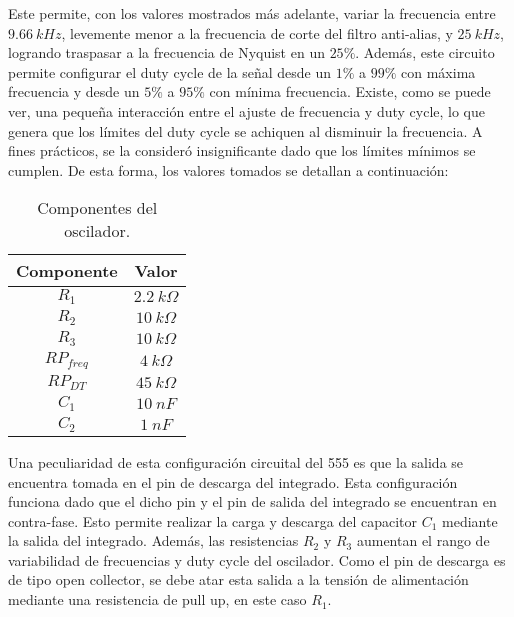 Este permite, con los valores mostrados más adelante, variar la frecuencia entre $9.66 \ kHz$, levemente menor a la frecuencia de corte del filtro anti-alias, y $25 \ kHz$, logrando traspasar a la frecuencia de Nyquist en un $25\%$. Además, este circuito permite configurar el duty cycle de la señal desde un $1\%$ a $99\%$ con máxima frecuencia y desde un $5\%$ a $95\%$ con mínima frecuencia. Existe, como se puede ver, una pequeña interacción entre el ajuste de frecuencia y duty cycle, lo que genera que los límites del duty cycle se achiquen al disminuir la frecuencia. A fines prácticos, se la consideró insignificante dado que los límites mínimos se cumplen. De esta forma, los valores tomados se detallan a continuación:
\begin{table}[H]
\centering
\begin{tabular}{cc}
\hline
Componente & Valor \\ \hline
$R_1$ & $2.2 \ k\Omega$ \\
$R_2$ & $10 \ k\Omega$ \\
$R_3$ & $10 \ k\Omega$  \\
$RP_{freq}$ & $4 \ k\Omega$  \\
$RP_{DT}$ & $45 \ k\Omega$  \\
$C_1$ & $10 \ nF$  \\
$C_2$ & $1 \ nF$\\ \hline
\end{tabular}
\caption{Componentes del oscilador.}
\end{table}

Una peculiaridad de esta configuración circuital del 555 es que la salida se encuentra tomada en el pin de descarga del integrado. Esta configuración funciona dado que el dicho pin y el pin de salida del integrado se encuentran en contra-fase. Esto permite realizar la carga y descarga del capacitor $C_1$ mediante la salida del integrado. Además, las resistencias $R_2$ y $R_3$ aumentan el rango de variabilidad de frecuencias y duty cycle del oscilador. Como el pin de descarga es de tipo open collector, se debe atar esta salida a la tensión de alimentación mediante una resistencia de pull up, en este caso $R_1$.

